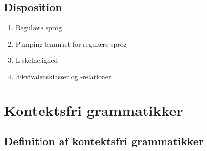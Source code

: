 \documentclass[a4, danish]{article}
\begin{document}
\newpage
\subsection{Disposition}
\begin{enumerate}
  \item Regulære sprog
  \item Pumping lemmaet for regulære sprog
  \item L-skelnelighed
  \item Ækvivalensklasser og -relationer
\end{enumerate}

\newpage
\section{Kontektsfri grammatikker}
\subsection{Definition af kontektsfri grammatikker}
\end{document}
